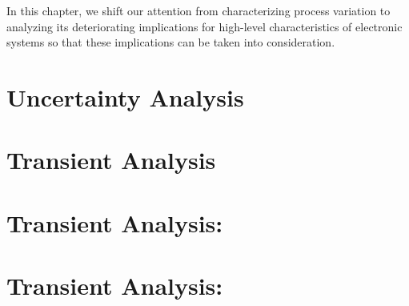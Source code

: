 In this chapter, we shift our attention from characterizing process variation to
analyzing its deteriorating implications for high-level characteristics of
electronic systems so that these implications can be taken into consideration.

\section{\introductiontitle}

\section{\motivationtitle}

\section{\problemtitle}

\section{\pasttitle}

\section{\solutiontitle}

\section{Uncertainty Analysis}

\section{Transient Analysis}

\section{Transient Analysis: \applicationtitle}

\section{Transient Analysis: \resultstitle}

